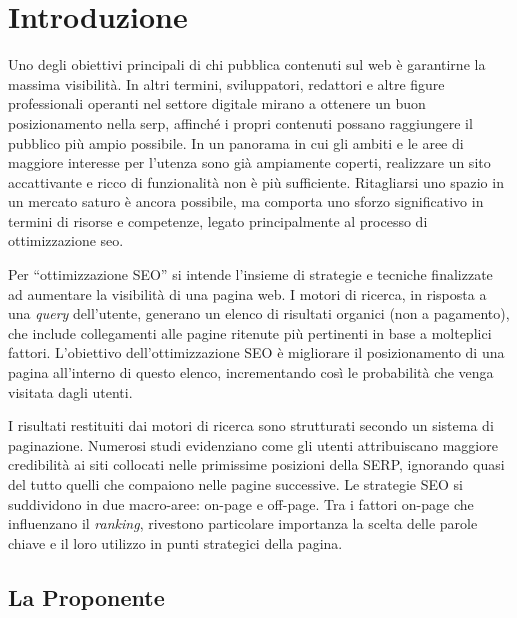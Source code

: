 \chapter{Introduzione}
\label{cap:introduzione}

\par Uno degli obiettivi principali di chi pubblica contenuti sul web è garantirne la massima visibilità. In altri termini, sviluppatori, redattori e altre figure professionali operanti nel settore digitale mirano a ottenere un buon posizionamento nella \gls{serp}, affinché i propri contenuti possano raggiungere il pubblico più ampio possibile. In un panorama in cui gli ambiti e le aree di maggiore interesse per l’utenza sono già ampiamente coperti, realizzare un sito accattivante e ricco di funzionalità non è più sufficiente. Ritagliarsi uno spazio in un mercato saturo è ancora possibile, ma comporta uno sforzo significativo in termini di risorse e competenze, legato principalmente al processo di ottimizzazione \gls{seo}.

\vspace{10pt}
\par\noindent Per “ottimizzazione SEO” si intende l’insieme di strategie e tecniche finalizzate ad aumentare la visibilità di una pagina web. I motori di ricerca, in risposta a una \textit{query} dell’utente, generano un elenco di risultati organici (non a pagamento), che include collegamenti alle pagine ritenute più pertinenti in base a molteplici fattori. L’obiettivo dell’ottimizzazione SEO è migliorare il posizionamento di una pagina all’interno di questo elenco, incrementando così le probabilità che venga visitata dagli utenti.

\vspace{10pt}
\par\noindent I risultati restituiti dai motori di ricerca sono strutturati secondo un sistema di paginazione. Numerosi studi evidenziano come gli utenti attribuiscano maggiore credibilità ai siti collocati nelle primissime posizioni della SERP, ignorando quasi del tutto quelli che compaiono nelle pagine successive. Le strategie SEO si suddividono in due macro-aree: \gls{on-page} e \gls{off-page}. Tra i fattori on-page che influenzano il \textit{ranking}, rivestono particolare importanza la scelta delle parole chiave e il loro utilizzo in punti strategici della pagina.

\section{La Proponente}

